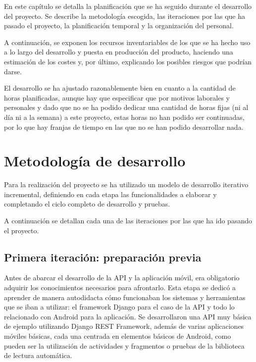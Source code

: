 En este capítulo se detalla la planificación que se ha seguido durante el
desarrollo del proyecto. Se describe la metodología escogida, las iteraciones
por las que ha pasado el proyecto, la planificación temporal y la organización
del personal.

A continuación, se exponen los recursos inventariables de los que se ha hecho
uso a lo largo del desarrollo y puesta en producción del producto, haciendo una
estimación de los costes y, por último, explicando los posibles riesgos que
podrían darse.

El desarrollo se ha ajustado razonablemente bien en cuanto a la
cantidad de horas planificadas, aunque hay que especificar que por motivos
laborales y personales y dado que no se ha podido dedicar una cantidad de horas
fijas (ni al día ni a la semana) a este proyecto, estas horas no han podido ser
continuadas, por lo que hay franjas de tiempo en las que no se han podido
desarrollar nada.

\section{Metodología de desarrollo}

Para la realización del proyecto se ha utilizado un modelo de desarrollo
iterativo incremental, definiendo en cada etapa las funcionalidades a
elaborar y completando el ciclo completo de desarrollo y pruebas. 

A continuación se detallan cada una de las iteraciones por las que ha ido
pasando el proyecto.

\subsection{Primera iteración: preparación previa}
\label{sec:primera_iteracion}

Antes de abarcar el desarrollo de la \ac{API} y la aplicación móvil, era
obligatorio adquirir los conocimientos necesarios para afrontarlo. Esta etapa se
dedicó a aprender de manera autodidacta cómo funcionaban los sistemas y
herramientas que se iban a utilizar: el framework Django para el caso de la API y
todo lo relacionado con Android para la aplicación. Se desarrollaron una API muy
básica de ejemplo utilizando Django REST Framework, además de varias
aplicaciones móviles básicas, cada una centrada en elementos básicos de Android,
como pueden ser la utilización de actividades y fragmentos o pruebas de la
biblioteca de lectura automática.

